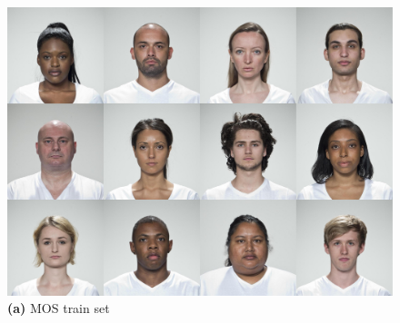 \begin{figure}
    \centering
    \begin{minipage}[t]{0.76\textwidth}
        \centering
        \includegraphics[width=\textwidth]{images/mos_train_set.pdf}\\
        \textbf{(a)} MOS train set %
    \end{minipage}
    \hfill
    \begin{minipage}[t]{0.19\textwidth}
        \centering

\end{minipage}
\end{figure}
